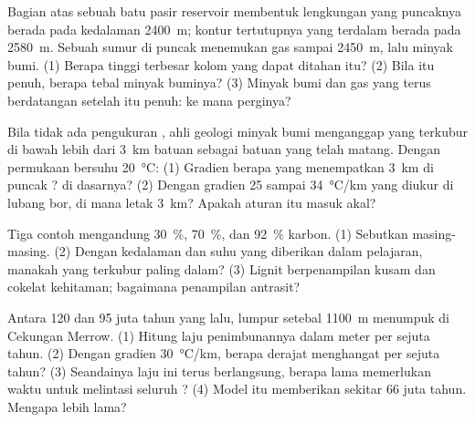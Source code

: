 \begin{exercise}[$\star\star$]\label{exo:g11:fossil-fuel-geology:9}
Bagian atas sebuah batu pasir reservoir membentuk lengkungan yang puncaknya
berada pada kedalaman \qty{2400}{m}; kontur tertutupnya yang terdalam berada
pada \qty{2580}{m}. Sebuah sumur di puncak menemukan gas sampai \qty{2450}{m},
lalu minyak bumi. (1) Berapa tinggi terbesar kolom yang dapat ditahan 
itu? (2) Bila  itu penuh, berapa tebal minyak buminya? (3) Minyak bumi
dan gas yang terus berdatangan setelah  itu penuh: ke mana perginya?
\end{exercise}

\begin{exercise}[$\star\star$]\label{exo:g11:fossil-fuel-geology:10}
Bila tidak ada pengukuran , ahli geologi minyak bumi menganggap  yang terkubur di bawah lebih dari \qty{3}{km} batuan sebagai batuan yang
telah matang. Dengan permukaan bersuhu \qty{20}{\degreeCelsius}: (1) Gradien
berapa yang menempatkan \qty{3}{km} di puncak ? di dasarnya?
(2) Dengan gradien 25 sampai \qty{34}{\degreeCelsius/km} yang diukur di lubang
bor, di mana letak \qty{3}{km}? Apakah aturan itu masuk akal?
\end{exercise}

\begin{exercise}[$\star\star$]\label{exo:g11:fossil-fuel-geology:11}
Tiga contoh  mengandung \qty{30}{\percent}, \qty{70}{\percent}, dan
\qty{92}{\percent} karbon. (1) Sebutkan  masing-masing. (2) Dengan
kedalaman dan suhu yang diberikan dalam pelajaran, manakah yang terkubur paling
dalam? (3) Lignit berpenampilan kusam dan cokelat kehitaman; bagaimana
penampilan antrasit?
\end{exercise}

\begin{exercise}[$\star\star\star$]\label{exo:g11:fossil-fuel-geology:12}
Antara 120 dan 95 juta tahun yang lalu, lumpur setebal \qty{1100}{m} menumpuk di
Cekungan Merrow. (1) Hitung laju penimbunannya dalam meter per sejuta tahun.
(2) Dengan gradien \qty{30}{\degreeCelsius/km}, berapa derajat 
menghangat per sejuta tahun? (3) Seandainya laju ini terus berlangsung, berapa
lama  memerlukan waktu untuk melintasi seluruh ?
(4) Model itu memberikan sekitar 66 juta tahun. Mengapa lebih lama?
\end{exercise}

